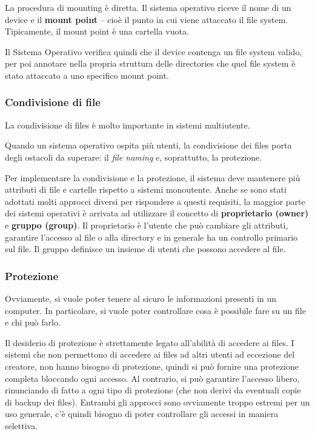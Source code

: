 \documentclass[a4]{article}
\begin{document}
La procedura di mounting è diretta. Il sistema operativo riceve il nome di un device e il \textbf{mount point} -- cioè il punto in cui viene attaccato il file system. Tipicamente, il mount point è una cartella vuota.

Il Sistema Operativo verifica quindi che il device contenga un file system valido, per poi annotare nella propria struttura delle directories che quel file system è stato attaccato a uno specifico mount point.

\subsubsection{Condivisione di file}
La condivisione di files è molto importante in sistemi multiutente.

Quando un sistema operativo ospita più utenti, la condivisione dei files porta degli ostacoli da superare: il \textit{file naming} e, soprattutto, la protezione.

Per implementare la condivisione e la protezione, il sistema deve mantenere più attributi di file e cartelle rispetto a sistemi monoutente. Anche se sono stati adottati molti approcci diversi per rispondere a questi requisiti, la maggior parte dei sistemi operativi è arrivata ad utilizzare il concetto di \textbf{proprietario (owner)} e \textbf{gruppo (group)}. Il proprietario è l'utente che può cambiare gli attributi, garantire l'accesso al file o alla directory e in generale ha un controllo primario sul file. Il gruppo definisce un insieme di utenti che possono accedere al file.

\subsubsection{Protezione}
Ovviamente, si vuole poter tenere al sicuro le informazioni presenti in un computer. In particolare, si vuole poter controllare cosa è possibile fare su un file e chi può farlo.

Il desiderio di protezione è strettamente legato all'abilità di accedere ai files. I sistemi che non permettono di accedere ai files ad altri utenti ad eccezione del creatore, non hanno bisogno di protezione, quindi si può fornire una protezione completa bloccando ogni accesso. Al contrario, si può garantire l'accesso libero, rinunciando di fatto a ogni tipo di protezione (che non derivi da eventuali copie di backup dei files). Entrambi gli approcci sono ovviamente troppo estremi per un uso generale, c'è quindi bisogno di poter controllare gli accessi in maniera selettiva.
\end{document}
